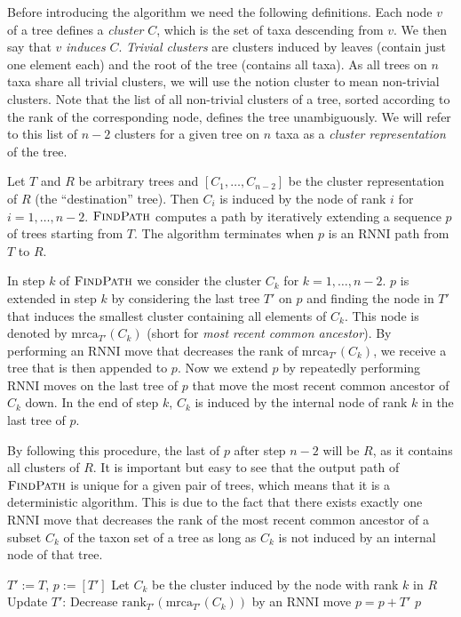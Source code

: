 \documentclass{amsart}
\newcommand{\mrca}{\mathrm{mrca}}
\newcommand{\rank}{\mathrm{rank}}
\newcommand{\rnni}{\mathrm{RNNI}}
\newcommand{\findpath}{\textsc{FindPath}}
\begin{document}
Before introducing the algorithm we need the following definitions.
Each node $v$ of a tree defines a \emph{cluster} $C$, which is the set of taxa descending from $v$.
We then say that $v$ \emph{induces} $C$.
\emph{Trivial clusters} are clusters induced by leaves (contain just one element each) and the root of the tree (contains all taxa).
As all trees on $n$ taxa share all trivial clusters, we will use the notion cluster to mean non-trivial clusters.
Note that the list of all non-trivial clusters of a tree, sorted according to the rank of the corresponding node, defines the tree unambiguously.
We will refer to this list of $n-2$ clusters for a given tree on $n$ taxa as a \emph{cluster representation} of the tree.

Let $T$ and $R$ be arbitrary trees and $[C_1, \ldots, C_{n-2}]$ be the cluster representation of $R$ (the ``destination'' tree).
Then $C_i$ is induced by the node of rank $i$ for $i = 1, \ldots, n-2$.
$\findpath$ computes a path by iteratively extending a sequence $p$ of trees starting from $T$.
The algorithm terminates when $p$ is an $\rnni$ path from $T$ to $R$.

In step $k$ of $\findpath$ we consider the cluster $C_k$ for $k = 1, \ldots, n-2$.
$p$ is extended in step $k$ by considering the last tree $T'$ on $p$ and finding the node in $T'$ that induces the smallest cluster containing all elements of $C_k$.
This node is denoted by $\mrca_{T'}(C_k)$ (short for \emph{most recent common ancestor}).
By performing an $\rnni$ move that decreases the rank of $\mrca_{T'}(C_k)$, we receive a tree that is then appended to $p$.
Now we extend $p$ by repeatedly performing $\rnni$ moves on the last tree of $p$ that move the most recent common ancestor of $C_k$ down.
In the end of step $k$, $C_k$ is induced by the internal node of rank $k$ in the last tree of $p$.

By following this procedure, the last of $p$ after step $n-2$ will be $R$, as it contains all clusters of $R$.
It is important but easy to see that the output path of $\findpath$ is unique for a given pair of trees, which means that it is a deterministic algorithm.
This is due to the fact that there exists exactly one $\rnni$ move that decreases the rank of the most recent common ancestor of a subset $C_k$ of the taxon set of a tree as long as $C_k$ is not induced by an internal node of that tree.

\begin{algorithm}[H]
\caption{$\findpath$($T,R$)}
\label{alg:find_path}
\begin{algorithmic}[1]
\STATE $T' := T$, $p := [T']$
  \STATE Let $C_k$ be the cluster induced by the node with rank $k$ in $R$ \label{alg:find_path:line:cluster}
  \WHILE {$\rank_{T'}(\mrca_{T'}(C_k))>k$}
    \STATE Update $T'$: Decrease $\rank_{T'}(\mrca_{T'}(C_k))$ by an $\rnni$ move \label{alg:findpath:line:move_set_down}
    \STATE $p = p+T'$
  \ENDWHILE
\ENDFOR
\RETURN $p$
\end{algorithmic}
\end{algorithm}
\end{document}
